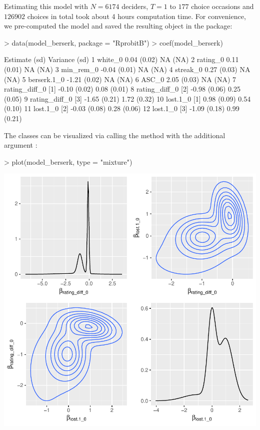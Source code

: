 \documentclass[article]{jss}
\newcommand{\fct}[1]{\code{#1()}}
\begin{document}
Estimating this model with $N = 6174$ deciders, $T = 1$ to $177$ choice occasions and $126902$ choices in total took about 4 hours computation time. For convenience, we pre-computed the model and saved the resulting  object in the package:

\begin{Schunk}
\begin{Sinput}
> data(model_berserk, package = "RprobitB")
> coef(model_berserk)
\end{Sinput}
\begin{Soutput}
                     Estimate   (sd) Variance   (sd)
1           white_0      0.04 (0.02)       NA   (NA)
2          rating_0      0.11 (0.01)       NA   (NA)
3         min_rem_0     -0.04 (0.01)       NA   (NA)
4          streak_0      0.27 (0.03)       NA   (NA)
5       berserk.1_0     -1.21 (0.02)       NA   (NA)
6             ASC_0      2.05 (0.03)       NA   (NA)
7  rating_diff_0 [1]    -0.10 (0.02)     0.08 (0.01)
8  rating_diff_0 [2]    -0.98 (0.06)     0.25 (0.05)
9  rating_diff_0 [3]    -1.65 (0.21)     1.72 (0.32)
10      lost.1_0 [1]     0.98 (0.09)     0.54 (0.10)
11      lost.1_0 [2]    -0.03 (0.08)     0.28 (0.06)
12      lost.1_0 [3]    -1.09 (0.18)     0.99 (0.21)
\end{Soutput}
\end{Schunk}

The classes can be visualized via calling the \fct{plot} method with the additional argument :

\begin{Schunk}
\begin{Sinput}
> plot(model_berserk, type = "mixture")
\end{Sinput}
\end{Schunk}
\includegraphics{rprobitb_oelschlaeger_bauer-model-berserk-mixture}
\end{document}

